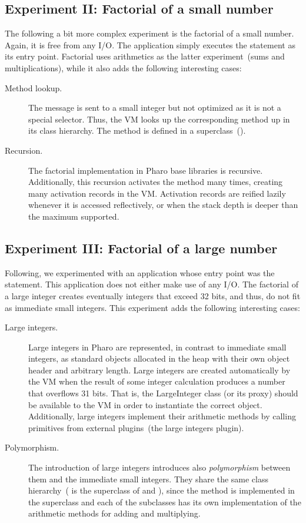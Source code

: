 \subsection*{Experiment II: Factorial of a small number}

The following a bit more complex experiment is the factorial of a small number. Again, it is free from any I/O. The application simply executes the  statement as its entry point. Factorial uses arithmetics as the latter experiment~(sums and multiplications), while it also adds the following interesting cases:

\begin{description}
\item[Method lookup.] The  message is sent to a small integer but not optimized as it is not a special selector. Thus, the VM looks up the corresponding method up in its class hierarchy. The method  is defined in a superclass~().
\item[Recursion.] The factorial implementation in Pharo base libraries is recursive. Additionally, this recursion activates the  method many times, creating many activation records in the VM. Activation records are reified lazily whenever it is accessed reflectively, or when the stack depth is deeper than the maximum supported.
\end{description}

\subsection*{Experiment III: Factorial of a large number}

Following, we experimented with an application whose entry point was the  statement. This application does not either make use of any I/O. The factorial of a large integer creates eventually integers that exceed 32 bits, and thus, do not fit as immediate small integers. This experiment adds the following interesting cases:
\begin{description}
\item[Large integers.] Large integers in Pharo are represented, in contrast to immediate small integers, as standard objects allocated in the heap with their own object header and arbitrary length. Large integers are created automatically by the VM when the result of some integer calculation produces a number that overflows 31 bits. That is, the LargeInteger class (or its proxy) should be available to the VM in order to instantiate the correct object.  Additionally, large integers implement their arithmetic methods by calling primitives from external plugins~(the large integers plugin).
\item[Polymorphism.] The introduction of large integers introduces also \emph{polymorphism} between them and the immediate small integers. They share the same class hierarchy~( is the superclass of  and ), since the method  is implemented in the superclass and each of the subclasses has its own implementation of the arithmetic methods for adding and multiplying.
\end{description}


